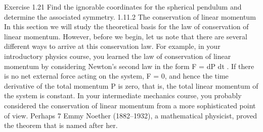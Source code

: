 \begin{exercise}
Exercise 1.21 Find the ignorable coordinates for the spherical pendulum
and determine the associated symmetry.
1.11.2 The conservation of linear momentum
In this section we will study the theoretical basis for the law of conservation of
linear momentum. However, before we begin, let us note that there are several
different ways to arrive at this conservation law.
For example, in your introductory physics course, you learned the law of
conservation of linear momentum by considering Newton's second law in the
form
F = dP
dt .
If there is no net external force acting on the system, F = 0, and hence the time
derivative of the total momentum P is zero, that is, the total linear momentum
of the system is constant.
In your intermediate mechanics course, you probably considered the conservation of linear momentum from a more sophisticated point of view. Perhaps
7 Emmy Noether (1882--1932), a mathematical physicist, proved the theorem that is named
after her.


\end{exercise}
